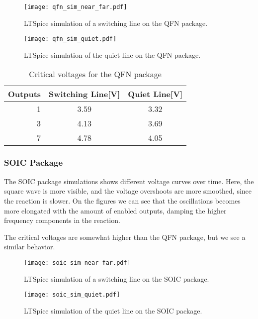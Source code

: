 \documentclass[../main.tex]{subfiles}
\begin{document}
\begin{figure}[h]
    \centering
    \texttt{[image: qfn\_sim\_near\_far.pdf]}
    \caption{LTSpice simulation of a switching line on the QFN package.}
    \label{fig:qfn_sim_near_far}
\end{figure}

\begin{figure}[h]
    \centering
    \texttt{[image: qfn\_sim\_quiet.pdf]}
    \caption{LTSpice simulation of the quiet line on the QFN package.}
    \label{fig:qfn_sim_quiet}
\end{figure}

\newpage

\begin{table}[h]
    \centering
    \begin{tabular}{r|c c}
        \toprule[1pt]
        \textbf{Outputs} & \textbf{Switching Line[V]} &\textbf{Quiet Line[V]} \\
        \midrule
        1  & 3.59  & 3.32 \\
        3  & 4.13  & 3.69 \\
        7  & 4.78  & 4.05 \\
        \bottomrule[1pt]
    \end{tabular}
    \caption{Critical voltages for the QFN package}
\end{table}

\subsubsection{SOIC Package}

The SOIC package simulations shows different voltage curves over time. Here, the square wave is more visible,
and the voltage overshoots are more smoothed, since the reaction is slower. 
On the figures we can see that the oscillations becomes more elongated with the amount of enabled outputs, damping the higher
frequency components in the reaction. 

The critical voltages are somewhat higher than the QFN package, but we see a similar behavior.

\begin{figure}[h]
    \centering
    \texttt{[image: soic\_sim\_near\_far.pdf]}
    \caption{LTSpice simulation of a switching line on the SOIC package.}
    \label{fig:soic_sim_near_far}
\end{figure}

\begin{figure}[h]
    \centering
    \texttt{[image: soic\_sim\_quiet.pdf]}
    \caption{LTSpice simulation of the quiet line on the SOIC package.}
    \label{fig:soic_sim_quiet}
\end{figure}
\end{document}
